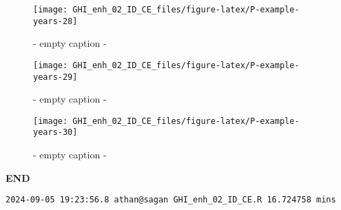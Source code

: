 \documentclass[
  10pt,
  a4paper,oneside]{article}
\begin{document}
\begin{figure}[H]

{\centering \texttt{[image: GHI\_enh\_02\_ID\_CE\_files/figure-latex/P-example-years-28]} 

}

\caption{ - empty caption - }\label{fig:P-example-years-28}
\end{figure}
\begin{figure}[H]

{\centering \texttt{[image: GHI\_enh\_02\_ID\_CE\_files/figure-latex/P-example-years-29]} 

}

\caption{ - empty caption - }\label{fig:P-example-years-29}
\end{figure}
\begin{figure}[H]

{\centering \texttt{[image: GHI\_enh\_02\_ID\_CE\_files/figure-latex/P-example-years-30]} 

}

\caption{ - empty caption - }\label{fig:P-example-years-30}
\end{figure}

\textbf{END}

\begin{verbatim}
2024-09-05 19:23:56.8 athan@sagan GHI_enh_02_ID_CE.R 16.724758 mins
\end{verbatim}
\end{document}
